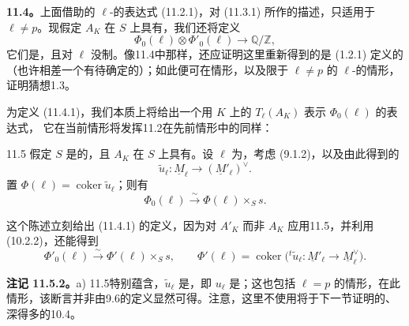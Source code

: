 \textbf{11.4。}上面借助的 $\ell$-的表达式 (11.2.1)，对 (11.3.1) 所作的描述，只适用于 $\ell\ne p$。现假定 $A_K$ 在 $S$ 上具有，我们还将定义
\begin{equation}\tag{11.4.1}
 \Phi_0(\ell)\otimes\Phi'_0(\ell)\longrightarrow\mathbb Q/\mathbb Z,
\end{equation}
它们是，且对 $\ell$ 没制。像11.4中那样，还应证明这里重新得到的是 (1.2.1) 定义的（也许相差一个有待确定的）；如此便可在情形，以及限于 $\ell\ne p$ 的 $\ell$-的情形，证明猜想1.3。

为定义 (11.4.1)，我们本质上将给出一个用 $K$ 上的 $T_\ell(A_K)$ 表示 $\Phi_0(\ell)$ 的表达式，
它在当前情形将发挥11.2在先前情形中的同样：

\begin{SGAresult}{}{11.5}
假定 $S$ 是的，且 $A_K$ 在 $S$ 上具有。设 $\ell$ 为，考虑 (9.1.2)，以及由此得到的
\[
 \widetilde u_\ell:\underline M_\ell\longrightarrow(\underline M'_\ell)^\vee.
\]
置 $\Phi(\ell)=\operatorname{coker}\widetilde u_\ell$；则有
\begin{equation}\tag{11.5.1}
 \Phi_0(\ell)\xrightarrow{\sim}\Phi(\ell)\times_Ss.
\end{equation}
\end{SGAresult}
这个陈述立刻给出 (11.4.1) 的定义，因为对 $A'_K$ 而非 $A_K$ 应用11.5，并利用 (10.2.2)，还能得到
\[
 \Phi'_0(\ell)\xrightarrow{\sim}\Phi'(\ell)\times_Ss,
 \qquad \Phi'(\ell)=\operatorname{coker}
 \bigl({}^t\widetilde u_\ell:\underline M'_\ell\longrightarrow\underline M_\ell^\vee\bigr).
\]

\textbf{注记 11.5.2。}a) 11.5特别蕴含，$\widetilde u_\ell$ 是，即 $u_\ell$ 是；这也包括 $\ell=p$ 的情形，在此情形，该断言并非由9.6的定义显然可得。注意，这里不使用将于下一节证明的、深得多的10.4。


